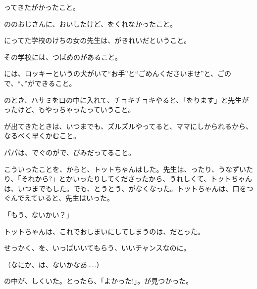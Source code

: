 ってきたがかったこと。

ののおじさんに、おいしたけど、をくれなかったこと。

にってた学校のけちの女の先生は、がきれいだということ。

その学校には、つばめのがあること。

には、ロッキーというの犬がいて“お手”と“ごめんくださいませ”と、ごので、“、”ができること。

のとき、ハサミを口の中に入れて、チョキチョキやると、「をります」と先生がったけど、もやっちゃったっていうこと。

が出てきたときは、いつまでも、ズルズルやってると、ママにしかられるから、なるべく早くかむこと。

パパは、でぐのがで、びみだってること。

こういったことを、からと、トットちゃんはした。先生は、ったり、うなずいたり、「それから?」とかいったりしてくださったから、うれしくて、トットちゃんは、いつまでもした。でも、とうとう、がなくなった。トットちゃんは、口をつぐんでえていると、先生はいった。

「もう、ないかい？」

トットちゃんは、これでおしまいにしてしまうのは、だとった。

せっかく、を、いっぱいいてもらう、いいチャンスなのに。

（なにか、は、ないかなあ……）

の中が、しくいた。とったら、「よかった!」。が見つかった。

